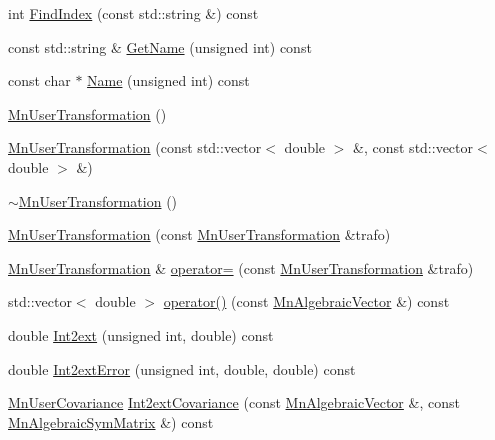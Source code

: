 \begin{DoxyCompactItemize}
\item 
int \mbox{\hyperlink{classROOT_1_1Minuit2_1_1MnUserTransformation_a9bccf4b65c979cb6b959f8fb787f676a}{Find\+Index}} (const std\+::string \&) const
\item 
const std\+::string \& \mbox{\hyperlink{classROOT_1_1Minuit2_1_1MnUserTransformation_aa9cb2ec1cc12b7aec1160394bb95833d}{Get\+Name}} (unsigned int) const
\item 
const char $\ast$ \mbox{\hyperlink{classROOT_1_1Minuit2_1_1MnUserTransformation_a83b4e1b3d5b020b4151d5dc30ff5488a}{Name}} (unsigned int) const
\item 
\mbox{\hyperlink{classROOT_1_1Minuit2_1_1MnUserTransformation_aabec69c71600612db11554ed60a76e21}{Mn\+User\+Transformation}} ()
\item 
\mbox{\hyperlink{classROOT_1_1Minuit2_1_1MnUserTransformation_a75c58c9381f8c42adcee7319d2671918}{Mn\+User\+Transformation}} (const std\+::vector$<$ double $>$ \&, const std\+::vector$<$ double $>$ \&)
\item 
\mbox{\hyperlink{classROOT_1_1Minuit2_1_1MnUserTransformation_a1510c72a07c9d089f16a4536ceacde56}{$\sim$\+Mn\+User\+Transformation}} ()
\item 
\mbox{\hyperlink{classROOT_1_1Minuit2_1_1MnUserTransformation_ae2bba4ce251f0eab8719900620addef9}{Mn\+User\+Transformation}} (const \mbox{\hyperlink{classROOT_1_1Minuit2_1_1MnUserTransformation}{Mn\+User\+Transformation}} \&trafo)
\item 
\mbox{\hyperlink{classROOT_1_1Minuit2_1_1MnUserTransformation}{Mn\+User\+Transformation}} \& \mbox{\hyperlink{classROOT_1_1Minuit2_1_1MnUserTransformation_a54aa66bb6edb8264484b6ece788b903c}{operator=}} (const \mbox{\hyperlink{classROOT_1_1Minuit2_1_1MnUserTransformation}{Mn\+User\+Transformation}} \&trafo)
\item 
std\+::vector$<$ double $>$ \mbox{\hyperlink{classROOT_1_1Minuit2_1_1MnUserTransformation_ae5f766bba2c9c99bf009e8799afc5348}{operator()}} (const \mbox{\hyperlink{namespaceROOT_1_1Minuit2_a62ed97730a1ca8d3fbaec64a19aa11c9}{Mn\+Algebraic\+Vector}} \&) const
\item 
double \mbox{\hyperlink{classROOT_1_1Minuit2_1_1MnUserTransformation_aa05e327d2e4376c0e1db865ba92becdd}{Int2ext}} (unsigned int, double) const
\item 
double \mbox{\hyperlink{classROOT_1_1Minuit2_1_1MnUserTransformation_ad900f367f4d2c5df13f899dd55bdf212}{Int2ext\+Error}} (unsigned int, double, double) const
\item 
\mbox{\hyperlink{classROOT_1_1Minuit2_1_1MnUserCovariance}{Mn\+User\+Covariance}} \mbox{\hyperlink{classROOT_1_1Minuit2_1_1MnUserTransformation_a10f2146be0a2c991243dd2f70a943a15}{Int2ext\+Covariance}} (const \mbox{\hyperlink{namespaceROOT_1_1Minuit2_a62ed97730a1ca8d3fbaec64a19aa11c9}{Mn\+Algebraic\+Vector}} \&, const \mbox{\hyperlink{namespaceROOT_1_1Minuit2_a9e74ad97f5537a2e80e52b04d98ecc6e}{Mn\+Algebraic\+Sym\+Matrix}} \&) const

\end{DoxyCompactItemize}
